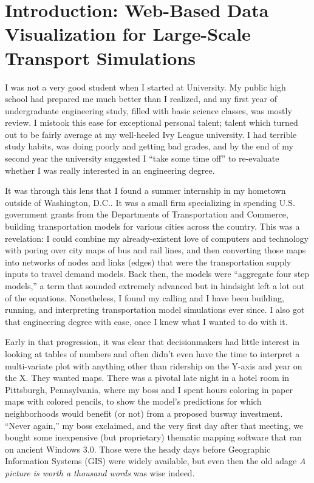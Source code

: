 \hypertarget{introduction-main}{%
\section{Introduction: Web-Based Data Visualization for Large-Scale Transport Simulations}
\label{introduction-main}}

I was not a very good student when I started at University. My public high school had prepared me much better than I realized, and my first year of undergraduate engineering study, filled with basic science classes, was mostly review. I mistook this ease for exceptional personal talent; talent which turned out to be fairly average at my well-heeled Ivy League university. I had terrible study habits, was doing poorly and getting bad grades, and by the end of my second year the university suggested I ``take some time off'' to re-evaluate whether I was really interested in an engineering degree.

It was through this lens that I found a summer internship in my hometown outside of Washington, D.C.. It was a small firm specializing in spending U.S. government grants from the Departments of Transportation and Commerce, building transportation models for various cities across the country. This was a revelation: I could combine my already-existent love of computers and technology with poring over city maps of bus and rail lines, and then converting those maps into networks of nodes and links (edges) that were the transportation supply inputs to travel demand models. Back then, the models were ``aggregate four step models,'' a term that sounded extremely advanced but in hindsight left a lot out of the equations. Nonetheless, I found my calling and I have been building, running, and interpreting transportation model simulations ever since. I also got that engineering degree with ease, once I knew what I wanted to do with it.

Early in that progression, it was clear that decisionmakers had little interest in looking at tables of numbers and often didn't even have the time to interpret a multi-variate plot with anything other than ridership on the Y-axis and year on the X. They wanted maps. There was a pivotal late night in a hotel room in Pittsburgh, Pennsylvania, where my boss and I spent hours coloring in paper maps with colored pencils, to show the model's predictions for which neighborhoods would benefit (or not) from a proposed busway investment. ``Never again,'' my boss exclaimed, and the very first day after that meeting, we bought some inexpensive (but proprietary) thematic mapping software that ran on ancient Windows 3.0. Those were the heady days before Geographic Information Systems (GIS) were widely available, but even then the old adage \emph{A picture is worth a thousand words} was wise indeed.

